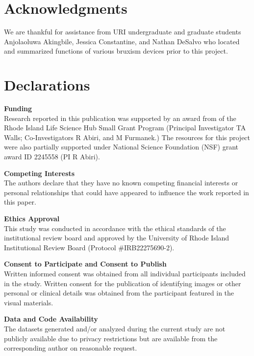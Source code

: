 \documentclass[pdflatex,sn-vancouver-num, iicol]{sn-jnl}
\begin{document}
\backmatter

\section{Acknowledgments}
We are thankful for assistance from URI undergraduate and graduate students Anjolaoluwa Akingbile, Jessica Constantine, and Nathan DeSalvo who located and summarized functions of various bruxism devices prior to this project.

\section*{Declarations}

\textbf{Funding} \\
Research reported in this publication was supported by an award from of the Rhode Island Life Science Hub Small Grant Program (Principal Investigator TA Walls; Co-Investigators R Abiri, and M Furmanek.) The resources for this project were also partially supported under National Science Foundation (NSF) grant award ID 2245558 (PI R Abiri). 

\textbf{Competing Interests} \\
The authors declare that they have no known competing financial interests or personal relationships that could have appeared to influence the work reported in this paper.

\textbf{Ethics Approval} \\
This study was conducted in accordance with the ethical standards of the institutional review board and approved by the University of Rhode Island Institutional Review Board (Protocol \#IRB22275690-2).

\textbf{Consent to Participate and Consent to Publish} \\
Written informed consent was obtained from all individual participants included in the study. Written consent for the publication of identifying images or other personal or clinical details was obtained from the participant featured in the visual materials.

\textbf{Data and Code Availability} \\
The datasets generated and/or analyzed during the current study are not publicly available due to privacy restrictions but are available from the corresponding author on reasonable request.
\end{document}
